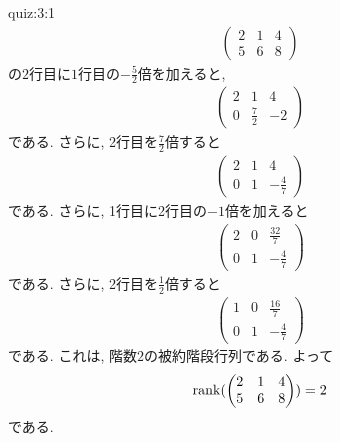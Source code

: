 \begin{answerof}{quiz:3:1}
  \begin{align*}
    \begin{pmatrix}
      2&1&4\\5&6&8
    \end{pmatrix}
  \end{align*}
  の$2$行目に$1$行目の$-\frac{5}{2}$倍を加えると,
  \begin{align*}
    \begin{pmatrix}
      2&1&4\\0&\frac{7}{2}&-2
    \end{pmatrix}
  \end{align*}
  である. さらに,
  2行目を$\frac{7}{2}$倍すると
  \begin{align*}
    \begin{pmatrix}
      2&1&4\\0&1&-\frac{4}{7}
    \end{pmatrix}
  \end{align*}
  である. さらに,
  1行目に2行目の$-1$倍を加えると
  \begin{align*}
    \begin{pmatrix}
      2&0&\frac{32}{7}\\0&1&-\frac{4}{7}
    \end{pmatrix}
  \end{align*}
  である. さらに,
  2行目を$\frac{1}{2}$倍すると
  \begin{align*}
    \begin{pmatrix}
      1&0&\frac{16}{7}\\0&1&-\frac{4}{7}
    \end{pmatrix}
  \end{align*}
  である.
  これは, 階数$2$の被約階段行列である.
  よって
  \begin{align*}
    \operatorname{rank}(
    \begin{pmatrix}
      2&1&4\\5&6&8
    \end{pmatrix}
    )=2
  \end{align*}
  である.
\end{answerof}


